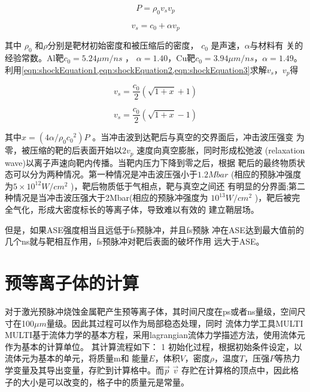 \begin{equation}
\label{eqn:shockEquation2}
P= \rho_0 v_s  v_p
\end{equation}     

\begin{equation}
\label{eqn:shockEquation3}
v_s = c_0 + \alpha v_p
\end{equation}     

其中 $\rho_0$ 和$\rho$分别是靶材初始密度和被压缩后的密度， $c_0$ 是声速，$\alpha$与材料有
关的经验常数。Al靶$c_0=5.24 \mu m/ns$ ， $\alpha=1.40$，Cu靶$c_0=3.94 \mu m/ns$，$\alpha=1.49$\cite{lundh2007influence}。利用\ref{eqn:shockEquation1,eqn:shockEquation2,eqn:shockEquation3}求解$v_s$，$v_p$得

\begin{equation}
\label{eqn:shockV}
v_s = \frac{c_0}{2} (\sqrt{1+x}+1)
\end{equation} 

\begin{equation}
\label{eqn:pressureV}
v_s = \frac{c_0}{2}(\sqrt{1+x}-1)
\end{equation} 


其中$x=(4 \alpha / {\rho}_0 {c_0}^2)P$ 。当冲击波到达靶后与真空的交界面后，冲击波压强变
为零，被压缩的靶的后表面开始以$2v_p$ 速度向真空膨胀，同时形成松弛波
(relaxation wave)以离子声速向靶内传播。当靶内压力下降到零之后，根据
靶后的最终物质状态可以分为两种情况。第一种情况是冲击波压强小于$1.2Mbar$
(相应的预脉冲强度为$5 \times {10}^{12}W/{cm}^2$ )，靶后物质低于气相点，靶与真空之间还
有明显的分界面;第二种情况是当冲击波压强大于2Mbar(相应的预脉冲强度为
${10}^{13}W/{cm}^2$ )，靶后被完全气化，形成大密度标长的等离子体，导致难以有效的
建立鞘层场\cite{batani2010effects}。

但是，如果ASE强度相当且远低于fs预脉冲，并且fs预脉
冲在ASE达到最大值前的几个ns就与靶相互作用，fs预脉冲对靶后表面的破坏作用
远大于ASE。









\section{预等离子体的计算}
对于激光预脉冲烧蚀金属靶产生预等离子体，其时间尺度在ps或者ns量级，空间尺寸在100$\mu m$量级。因此其过程可以作为局部稳态处理，同时
流体力学工具MULTI
MULTI基于流体力学的基本方程，采用lagrangian流体力学描述方法，使用流体元作为基本的计算单位。
其计算流程如下：
1 初始化过程，根据初始条件设定，以流体元为基本的单元，将质量m和 能量$E$，体积$V$，密度$\rho$，温度$T$，压强$P$等热力学变量及其导出变量，存贮到计算格中。而$\vec{p}$ $\vec{v}$ 存贮在计算格的顶点中，因此格子的大小是可以改变的，格子中的质量元是常量。

